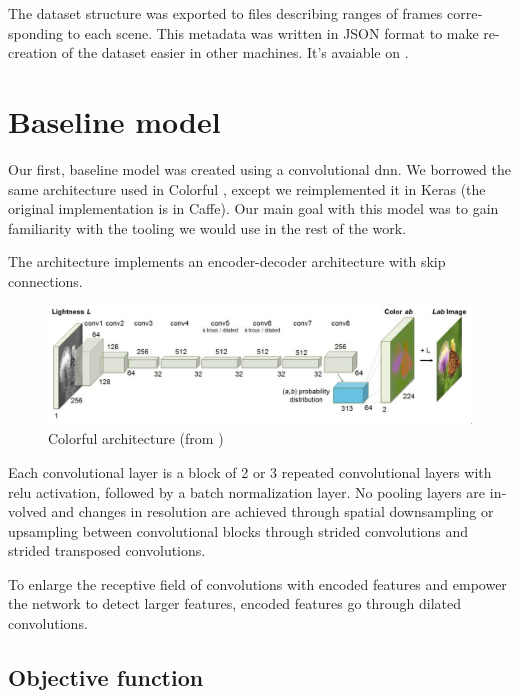 \documentclass[12pt,openright,oneside,a4paper,english]{abntex2}
\begin{document}
\begin{otherlanguage}{english}
    The dataset structure was exported to files describing ranges of frames corresponding to each scene. This metadata was written in JSON format to make re-creation of the dataset easier in other machines. It's avaiable on \cite{colormotion_dataset}.

    \section{Baseline model}

    Our first, baseline model was created using a convolutional \acrshort{dnn}. We borrowed the same architecture used in Colorful \cite{colorful}, except we reimplemented it in Keras (the original implementation is in Caffe). Our main goal with this model was to gain familiarity with the tooling we would use in the rest of the work.

    The architecture implements an encoder-decoder architecture with skip connections.

    \begin{figure}[!htb]
    \centering
    \includegraphics[width=\textwidth]{Colorful}
    \caption{Colorful architecture (from \cite{colorful})}
    \label{colorful_architecture_paper}
    \end{figure}

    Each convolutional layer is a block of 2 or 3 repeated convolutional layers with \acrshort{relu} activation, followed by a batch normalization layer. No pooling layers are involved and changes in resolution are achieved through spatial downsampling or upsampling between convolutional blocks through strided convolutions and strided transposed convolutions.

    To enlarge the receptive field of convolutions with encoded features and empower the network to detect larger features, encoded features go through dilated convolutions.

    \subsection{Objective function}


\end{otherlanguage}
\end{document}
